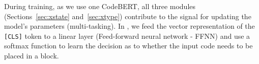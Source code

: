 During training, as we use one CodeBERT, all three modules
(Sections~\ref{sec:xstate} and~\ref{sec:xtype}) contribute to the
signal for updating the model's parameters (multi-tasking). In
{\xblock}, we feed the vector representation of the \texttt{[CLS]}
token to a linear layer (Feed-forward neural network - FFNN) and use a
softmax function to learn the decision as to whether the input code
needs to be placed in a  block.










